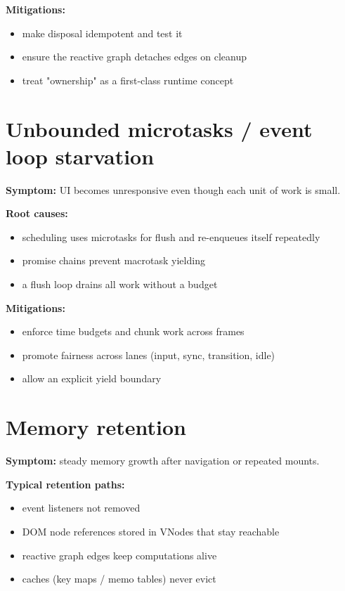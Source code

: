 \textbf{Mitigations:}
\begin{itemize}
  \item make disposal idempotent and test it
  \item ensure the reactive graph detaches edges on cleanup
  \item treat "ownership" as a first-class runtime concept
\end{itemize}

\section{Unbounded microtasks / event loop starvation}

\textbf{Symptom:} UI becomes unresponsive even though each unit of work is small.

\textbf{Root causes:}
\begin{itemize}
  \item scheduling uses microtasks for flush and re-enqueues itself repeatedly
  \item promise chains prevent macrotask yielding
  \item a flush loop drains all work without a budget
\end{itemize}

\textbf{Mitigations:}
\begin{itemize}
  \item enforce time budgets and chunk work across frames
  \item promote fairness across lanes (input, sync, transition, idle)
  \item allow an explicit yield boundary
\end{itemize}

\section{Memory retention}

\textbf{Symptom:} steady memory growth after navigation or repeated mounts.

\textbf{Typical retention paths:}
\begin{itemize}
  \item event listeners not removed
  \item DOM node references stored in VNodes that stay reachable
  \item reactive graph edges keep computations alive
  \item caches (key maps / memo tables) never evict
\end{itemize}

